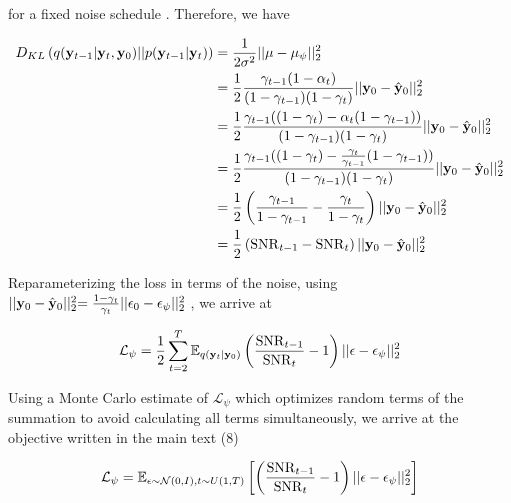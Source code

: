 \documentclass{article}
\begin{document}
for a fixed noise schedule \citep{Saharia2021}. Therefore, we have

\begin{align*}
D_{KL}\left(q(\bold{y}_{t-1}|\bold{y}_t,\bold{y}_0)\lvert\lvert p(\bold{y}_{t-1}|\bold{y}_t) \right) &= \frac{1}{2\sigma^{2}} \lvert\lvert \mu - \mu_{\psi} \lvert\lvert_{2}^{2} \\
&= \frac{1}{2}\frac{\gamma_{t-1}(1-\alpha_{t})}{(1-\gamma_{t-1})(1-\gamma_{t})}\lvert\lvert \bold{y}_{0} - \hat{\bold{y}}_{0} \lvert\lvert_{2}^{2}\\
&= \frac{1}{2}\frac{\gamma_{t-1}((1-\gamma_{t})-\alpha_{t}(1-\gamma_{t-1}))}{(1-\gamma_{t-1})(1-\gamma_{t})}\lvert\lvert \bold{y}_{0} - \hat{\bold{y}}_{0} \lvert\lvert_{2}^{2}\\
&= \frac{1}{2}\frac{\gamma_{t-1}((1-\gamma_{t})-\frac{\gamma_{t}}{\gamma_{t-1}}(1-\gamma_{t-1}))}{(1-\gamma_{t-1})(1-\gamma_{t})}\lvert\lvert \bold{y}_{0} - \hat{\bold{y}}_{0} \lvert\lvert_{2}^{2}\\
&= \frac{1}{2}\left(\frac{\gamma_{t-1}}{1-\gamma_{t-1}}-\frac{\gamma_{t}}{1-\gamma_{t}}\right)\lvert\lvert \bold{y}_{0} - \hat{\bold{y}}_{0} \lvert\lvert_{2}^{2}\\
&= \frac{1}{2}\left(\mathrm{SNR}_{t-1}-\mathrm{SNR}_{t}\right)\lvert\lvert \bold{y}_{0} - \hat{\bold{y}}_{0} \lvert\lvert_{2}^{2}
\end{align*}

Reparameterizing the loss in terms of the noise, using $\lvert\lvert \bold{y}_{0} - \hat{\bold{y}}_{0} \lvert\lvert_{2}^{2} = \frac{1-\gamma_{t}}{\gamma_{t}}\lvert\lvert \bold{\epsilon}_{0} - \epsilon_{\psi} \lvert\lvert_{2}^{2}$ \citep{Ribeiro2024}, we arrive at 

\begin{equation*}
\mathcal{L}_{\psi} = \frac{1}{2}\sum_{t=2}^{T} \mathbb{E}_{q(\bold{y}_{t}|\bold{y}_{0})}\left(\frac{\mathrm{SNR}_{t-1}}{{\mathrm{SNR}_{t}}}-1\right)\lvert\lvert \bold{\epsilon}-\bold{\epsilon}_{\psi}\lvert\lvert_{2}^{2}
\end{equation*}

Using a Monte Carlo estimate of $\mathcal{L}_{\psi}$ \citep{Kingma2023} which optimizes random terms of the summation to avoid calculating all terms simultaneously, we arrive at the objective written in the main text (8)

\begin{equation*}
\mathcal{L}_{\psi} = \mathbb{E}_{\epsilon\sim \mathcal{N}(0,I),t\sim U(1,T)}\left[\left(\frac{\mathrm{SNR}_{t-1}}{{\mathrm{SNR}_{t}}}-1\right)\lvert\lvert \bold{\epsilon}-\bold{\epsilon}_{\psi}\lvert\lvert_{2}^{2}\right]
\end{equation*}
\end{document}
